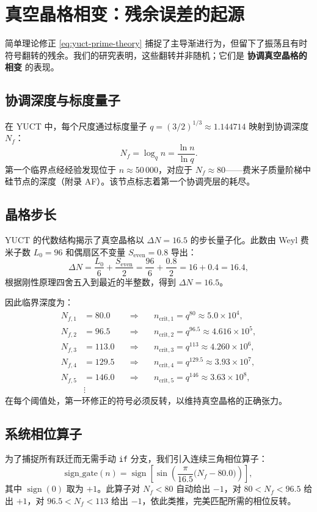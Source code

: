 \documentclass[11pt,a4paper]{article}
\newcommand{\Seven}{S_{\mathrm{even}}}
\begin{document}
	\section{真空晶格相变：残余误差的起源}
	\label{sec:phasetrans}
	简单理论修正 \eqref{eq:yuct-prime-theory} 捕捉了主导渐进行为，但留下了振荡且有时符号翻转的残余。我们的研究表明，这些翻转并非随机；它们是 \textbf{协调真空晶格的相变} 的表现。
	
	\subsection{协调深度与标度量子}
	在 YUCT 中，每个尺度通过标度量子 \(q = (3/2)^{1/3} \approx 1.144714\) 映射到协调深度 \(N_f\)：
	\[
	N_f = \log_q n = \frac{\ln n}{\ln q}.
	\]
	第一个临界点经经验发现位于 \(n \approx 50\,000\)，对应于 \(N_f \approx 80\)——费米子质量阶梯中硅节点的深度（附录 AF）。该节点标志着第一个协调壳层的耗尽。
	
	\subsection{晶格步长}
	YUCT 的代数结构揭示了真空晶格以 \(\Delta N = 16.5\) 的步长量子化。此数由 Weyl 费米子数 \(L_0 = 96\) 和偶扇区不变量 \(\Seven = 0.8\) 导出：
	\[
	\Delta N = \frac{L_0}{6} + \frac{\Seven}{2} = \frac{96}{6} + \frac{0.8}{2} = 16 + 0.4 = 16.4,
	\]
	根据刚性原理四舍五入到最近的半整数，得到 \(\Delta N = 16.5\)。
	
	因此临界深度为：
	\begin{align}
		N_{f,1} &= 80.0 \quad &\Longrightarrow&\quad n_{\mathrm{crit},1} = q^{80} \approx 5.0\times10^4, \\
		N_{f,2} &= 96.5 \quad &\Longrightarrow&\quad n_{\mathrm{crit},2} = q^{96.5} \approx 4.616\times10^5, \\
		N_{f,3} &= 113.0 \quad &\Longrightarrow&\quad n_{\mathrm{crit},3} = q^{113} \approx 4.260\times10^6, \\
		N_{f,4} &= 129.5 \quad &\Longrightarrow&\quad n_{\mathrm{crit},4} = q^{129.5} \approx 3.93\times10^7, \\
		N_{f,5} &= 146.0 \quad &\Longrightarrow&\quad n_{\mathrm{crit},5} = q^{146} \approx 3.63\times10^8, \\
		&\vdots & &
	\end{align}
	在每个阈值处，第一环修正的符号必须反转，以维持真空晶格的正确张力。
	
	\subsection{系统相位算子}
	为了捕捉所有跃迁而无需手动 \texttt{if} 分支，我们引入连续三角相位算子：
	\begin{equation}
		\boxed{\mathrm{sign\_gate}(n) = \operatorname{sign}\!\left[\sin\!\left(\frac{\pi}{16.5}\bigl(N_f - 80.0\bigr)\right)\right]},
		\label{eq:phaseoperator}
	\end{equation}
	其中 \(\operatorname{sign}(0)\) 取为 \(+1\)。此算子对 \(N_f<80\) 自动给出 \(-1\)，对 \(80 < N_f < 96.5\) 给出 \(+1\)，对 \(96.5 < N_f < 113\) 给出 \(-1\)，依此类推，完美匹配所需的相位反转。
	
\end{document}
